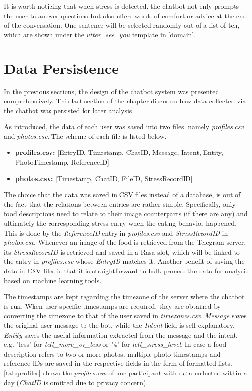 It is worth noticing that when stress is detected, the chatbot not only prompts the user to answer questions but also offers words of comfort or advice at the end of the conversation. One sentence will be selected randomly out of a list of ten, which are shown under the \emph{utter\_see\_you} template in \autoref{domain}.

\section{Data Persistence} \label{data_persis}
In the previous sections, the design of the chatbot system was presented comprehensively. This last section of the chapter discusses how data collected via the chatbot was persisted for later analysis.

As introduced, the data of each user was saved into two files, namely \emph{profiles.csv} and \emph{photos.csv}. The scheme of each file is listed below.

\begin{itemize}
  \item \textbf{profiles.csv:} [EntryID, Timestamp, ChatID, Message, Intent, Entity, PhotoTimestamp, ReferenceID]
  \item \textbf{photos.csv:} [Timestamp, ChatID, FileID, StressRecordID]
\end{itemize}

The choice that the data was saved in CSV files instead of a database, is out of the fact that the relations between entries are rather simple. Specifically, only food descriptions need to relate to their image counterparts (if there are any) and ultimately the corresponding stress entry when the eating behavior happened. This is done by the \emph{ReferenceID} entry in \emph{profiles.csv} and \emph{StressRecordID} in \emph{photos.csv}. Whenever an image of the food is retrieved from the Telegram server, its \emph{StressRecordID} is retrieved and saved in a Rasa slot, which will be linked to the entry in \emph{profiles.csv} whose \emph{EntryID} matches it. Another benefit of saving the data in CSV files is that it is straightforward to bulk process the data for analysis based on machine learning tools.

The timestamps are kept regarding the timezone of the server where the chatbot is run. When user-specific timestamps are required, they are obtained by converting the timezone to that of the user saved in \emph{timezones.csv}. \emph{Message} saves the original user message to the bot, while the \emph{Intent} field is self-explanatory. \emph{Entity} saves the useful information extracted from the message and the intent, e.g. "less" for \emph{tell\_more\_or\_less} or "4" for \emph{tell\_stress\_level}. In case a food description refers to two or more photos, multiple photo timestamps and reference IDs are saved in the respective fields in the form of formatted lists. \autoref{tab:profiles} shows the \emph{profiles.csv} of one participant with data collected within a day (\emph{ChatID} is omitted due to privacy concern).

